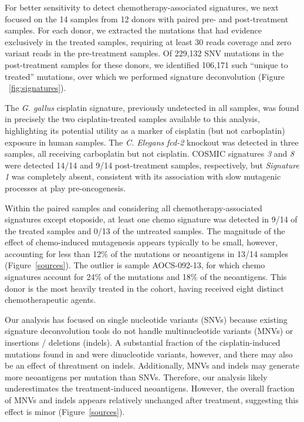 For better sensitivity to detect chemotherapy-associated signatures, we next focused on the 14 samples from 12 donors with paired pre- and post-treatment samples. For each donor, we extracted the mutations that had evidence exclusively in the treated samples, requiring at least 30 reads coverage and zero variant reads in the pre-treatment samples. Of 229,132 SNV mutations in the post-treatment samples for these donors, we identified 106,171 such ``unique to treated'' mutations, over which we performed signature deconvolution (Figure ~\ref{fig:signatures}).

The \textit{G. gallus} cisplatin signature, previously undetected in all samples, was found in precisely the two cisplatin-treated samples available to this analysis, highlighting its potential utility as a marker of cisplatin (but not carboplatin) exposure in human samples. The \textit{C. Elegans} \textit{fcd-2} knockout was detected in three samples, all receiving carboplatin but not cisplatin. COSMIC signatures \textit{3} and \textit{8} were detected 14/14 and 9/14 post-treatment samples, respectively, but \textit{Signature 1} was completely absent, consistent with its association with slow mutagenic processes at play pre-oncogenesis.

Within the paired samples and considering all chemotherapy-associated signatures except etoposide, at least one chemo signature was detected in 9/14 of the treated samples and 0/13 of the untreated samples. The magnitude of the effect of chemo-induced mutagenesis appears typically to be small, however, accounting for less than 12\% of the mutations or neoantigens in 13/14 samples (Figure~\ref{sources}). The outlier is sample AOCS-092-13, for which chemo signatures account for 24\% of the mutations and 18\% of the neoantigens. This donor is the most heavily treated in the cohort, having received eight distinct chemotherapeutic agents.

Our analysis has focused on single nucleotide variants (SNVs) because existing signature deconvolution tools do not handle multinucleotide variants (MNVs) or insertions / deletions (indels). A substantial fraction of the cisplatin-induced mutations found in \cite{Meier_2014} and \cite{Szikriszt_2016} were dinucleotide variants, however, and there may also be an effect of threatment on indels. Additionally, MNVs and indels may generate more neoantigens per mutation than SNVs. Therefore, our analysis likely underestimates the treatment-induced neoantigens. However, the overall fraction of MNVs and indels appears relatively unchanged after treatment, suggesting this effect is minor (Figure~\ref{sources}).


